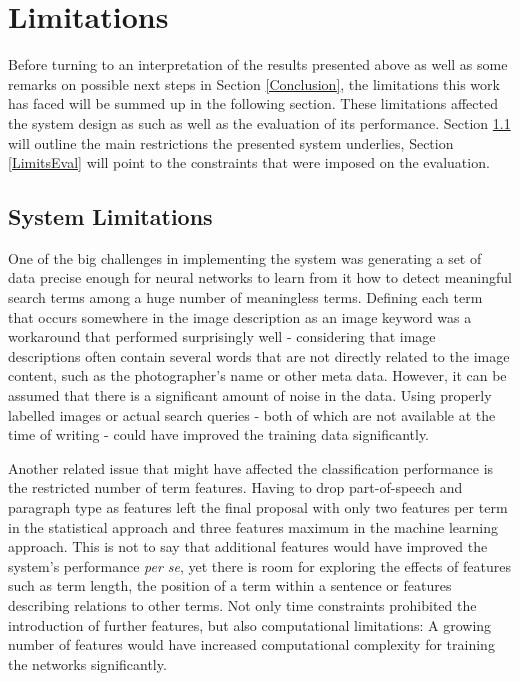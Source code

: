 \documentclass[11pt,a4paper,twoside]{article}
\begin{document}

\cleardoublepage

\section{Limitations} \label{Limits}

Before turning to an interpretation of the results presented above as well as some remarks on possible next steps in Section \ref{Conclusion}, the limitations this work has faced will be summed up in the following section. These limitations affected the system design as such as well as the evaluation of its performance. Section \ref{LimitsSystem} will outline the main restrictions the presented system underlies, Section \ref{LimitsEval} will point to the constraints that were imposed on the evaluation.

\subsection{System Limitations} \label{LimitsSystem}

One of the big challenges in implementing the system was generating a set of data precise enough for neural networks to learn from it how to detect meaningful search terms among a huge number of meaningless terms. Defining each term that occurs somewhere in the image description as an image keyword was a workaround that performed surprisingly well - considering that image descriptions often contain several words that are not directly related to the image content, such as the photographer's name or other meta data. However, it can be assumed that there is a significant amount of noise in the data. Using properly labelled images or actual search queries - both of which are not available at the time of writing - could have improved the training data significantly.

Another related issue that might have affected the classification performance is the restricted number of term features. Having to drop part-of-speech and paragraph type as features left the final proposal with only two features per term in the statistical approach and three features maximum in the machine learning approach. This is not to say that additional features would have improved the system's performance \emph{per se}, yet there is room for exploring the effects of features such as term length, the position of a term within a sentence or features describing relations to other terms. Not only time constraints prohibited the introduction of further features, but also computational limitations: A growing number of features would have increased computational complexity for training the networks significantly.
\end{document}

